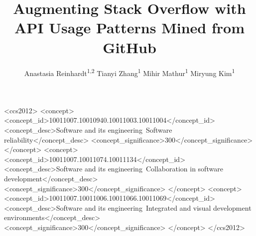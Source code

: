 \documentclass[sigconf, screen]{acmart}
\begin{document}
\title{Augmenting Stack Overflow with API Usage Patterns Mined from GitHub}

\author{Anastasia Reinhardt\textsuperscript{1,2}\footnotemark\,\,Tianyi Zhang\textsuperscript{1}\footnotemark\,\,Mihir Mathur\textsuperscript{1}\,\,Miryung Kim\textsuperscript{1}}

%
%
%


\renewcommand{\authors}{Anastasia Reinhart, Tianyi Zhang, Mihir Mathur, and Miryung Kim}
\renewcommand{\shortauthors}{Anastasia Reinhart, Tianyi Zhang, Mihir Mathur, and Miryung Kim}



\begin{CCSXML}
<ccs2012>
<concept>
<concept_id>10011007.10010940.10011003.10011004</concept_id>
<concept_desc>Software and its engineering~Software reliability</concept_desc>
<concept_significance>300</concept_significance>
</concept>
<concept>
<concept_id>10011007.10011074.10011134</concept_id>
<concept_desc>Software and its engineering~Collaboration in software development</concept_desc>
<concept_significance>300</concept_significance>
</concept>
<concept>
<concept_id>10011007.10011006.10011066.10011069</concept_id>
<concept_desc>Software and its engineering~Integrated and visual development environments</concept_desc>
<concept_significance>300</concept_significance>
</concept>
</ccs2012>
\end{CCSXML}

\end{document}
